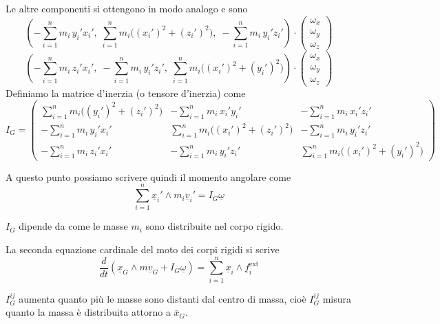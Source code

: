 Le altre componenti si ottengono in modo analogo e sono
\[
\left(
-\sum_{i=1}^{n} m_i\,y_i' x_i',
\;
\sum_{i=1}^{n} m_i\bigl((x_i')^2+(z_i')^2\bigr),
\;
-\sum_{i=1}^{n} m_i\,y_i' z_i'
\right)\cdot
\begin{pmatrix}
\omega_x\\
\omega_y\\
\omega_z
\end{pmatrix}
\]
\[
\left(
-\sum_{i=1}^{n} m_i\,z_i' x_i',
\;
-\sum_{i=1}^{n} m_i\,y_i' z_i',
\;
\sum_{i=1}^{n} m_i\bigl((x_i')^2+(y_i')^2\bigr)
\right)\cdot
\begin{pmatrix}
\omega_x\\
\omega_y\\
\omega_z
\end{pmatrix}
\]
Definiamo la matrice d'inerzia (o tensore d'inerzia) come
\[
I_G=
\left(
\begin{array}{ccc}
\displaystyle \sum_{i=1}^{n} m_i\bigl((y_i')^2+(z_i')^2\bigr)
&
\displaystyle -\sum_{i=1}^{n} m_i\,x_i'y_i'
&
\displaystyle -\sum_{i=1}^{n} m_i\,x_i'z_i'
\\[1.2em]
\displaystyle -\sum_{i=1}^{n} m_i\,y_i'x_i'
&
\displaystyle \sum_{i=1}^{n} m_i\bigl((x_i')^2+(z_i')^2\bigr)
&
\displaystyle -\sum_{i=1}^{n} m_i\,y_i'z_i'
\\[1.2em]
\displaystyle -\sum_{i=1}^{n} m_i\,z_i'x_i'
&
\displaystyle -\sum_{i=1}^{n} m_i\,y_i'z_i'
&
\displaystyle \sum_{i=1}^{n} m_i\bigl((x_i')^2+(y_i')^2\bigr)
\end{array}
\right)
\]

A questo punto possiamo scrivere quindi il momento angolare come
\[
\sum_{i=1}^{n}\underline{x}_i'\wedge m_i\underline{v}_i'
=
I_G\underline{\omega}
\]

\(I_G\) dipende da come le masse \(m_i\) sono distribuite nel corpo rigido.

La seconda equazione cardinale del moto dei corpi rigidi si scrive
\[
\frac{d}{dt}\left(\underline{x}_G\wedge m\underline{v}_G+I_G\underline{\omega}\right)
=
\sum_{i=1}^{n}\underline{x}_i\wedge \underline{f}_i^{\mathrm{ext}}
\]

\begin{oss}{}
  $I^{i j}_G$ aumenta quanto più le masse sono distanti dal centro di massa, cioè $I^{i j}_G$ misura quanto la massa è distribuita attorno a $\overline{x}_G$.
\end{oss}


